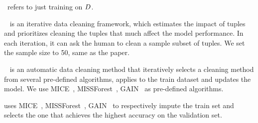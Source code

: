 
~refers to just training on $D$.

~\cite{DBLP:journals/pvldb/KrishnanWWFG16} is an iterative data cleaning framework, which estimates the impact of tuples  and prioritizes cleaning the tuples that much affect the model performance. In each iteration, it can ask the human to clean a sample subset of tuples. We set the sample size to 50, same as the paper. 

~\cite{DBLP:journals/corr/abs-1711-01299} is an automatic  data cleaning method that iteratively selects a cleaning method from several pre-defined algorithms, applies to the train dataset and  updates the model.  We use MICE~\cite{royston2011multiple}, MISSForest~\cite{DBLP:journals/bioinformatics/StekhovenB12}, GAIN~\cite{DBLP:conf/icml/YoonJS18} as pre-defined algorithms.


  uses MICE~\cite{royston2011multiple}, MISSForest~\cite{DBLP:journals/bioinformatics/StekhovenB12}, GAIN~\cite{DBLP:conf/icml/YoonJS18} to respectively impute the train set and selects the one that achieves the highest accuracy on the validation set.

